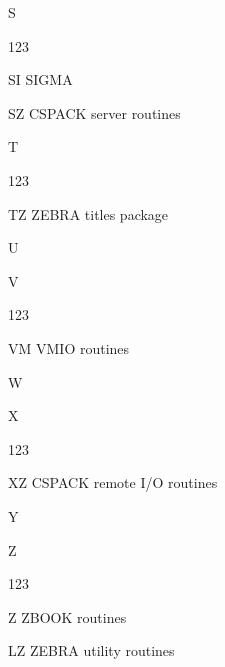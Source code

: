 \begin{DLtt}{1}
\item[S]

\begin{DLtt}{123}
\item[SI]SIGMA 
\item[SZ]CSPACK server routines
\end{DLtt}

\item[T]

\begin{DLtt}{123}
\item[TZ]ZEBRA titles package
\end{DLtt}

\item[U]

\item[V]

\begin{DLtt}{123}
\item[VM]VMIO routines
\end{DLtt}

\item[W]

\item[X]

\begin{DLtt}{123}
\item[XZ]CSPACK remote I/O routines
\end{DLtt}

\item[Y]

\item[Z]

\begin{DLtt}{123}
\item[Z]ZBOOK routines
\item[LZ]ZEBRA utility routines
\end{DLtt}

\end{DLtt}
